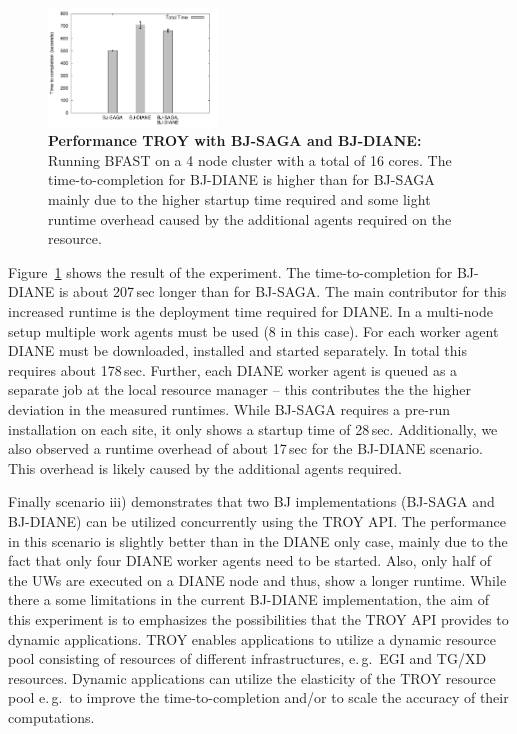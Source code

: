 \documentclass[conference,final]{IEEEtran}
\newcommand{\upp}{\vspace*{-0.5em}}
\begin{document}
\begin{figure}[t]
	\centering
		\includegraphics[width=0.4\textwidth]{perf/perf-bfast-bj.pdf}
	\caption{\textbf{Performance TROY with BJ-SAGA and BJ-DIANE:} Running BFAST 
	on a 4 node cluster with a total of 16 cores. The time-to-completion for 
	BJ-DIANE is higher than for BJ-SAGA mainly due to the higher startup 
	time required and some light runtime overhead caused by the additional 
	agents required on the resource.\upp \upp}
	\label{fig:perf_perf-bfast-bj}
\end{figure}



Figure~\ref{fig:perf_perf-bfast-bj} shows the result of the experiment. The
time-to-completion for BJ-DIANE is about 207\,sec longer than for BJ-SAGA. The
main contributor for this increased runtime is the deployment time required for
DIANE. In a multi-node setup multiple work agents must be used (8 in this case).
For each worker agent DIANE must be downloaded, installed and started
separately. In total this requires about 178\,sec. Further, each DIANE worker
agent is queued as a separate job at the local resource manager -- this
contributes the the higher deviation in the measured runtimes. While BJ-SAGA
requires a pre-run installation on each site, it only shows a startup time of
28\,sec. Additionally, we also observed a runtime overhead of about 17\,sec for
the BJ-DIANE scenario. This overhead is likely caused by the additional agents
required.



Finally scenario iii) demonstrates that two BJ implementations (BJ-SAGA and
BJ-DIANE) can be utilized concurrently using the TROY API. The performance in
this scenario is slightly better than in the DIANE only case, mainly due to the
fact that only four DIANE worker agents need to be started. Also, only half of
the UWs are executed on a DIANE node and thus, show a longer runtime. While
there a some limitations in the current BJ-DIANE implementation, the aim of this
experiment is to emphasizes the possibilities that the TROY API provides to
dynamic applications. TROY enables applications to utilize a dynamic resource
pool consisting of resources of different infrastructures, e.\,g.\
EGI and TG/XD resources. Dynamic applications can utilize the elasticity of the 
TROY resource pool e.\,g.\ to improve the time-to-completion and/or to scale the
accuracy of their computations.
\end{document}
